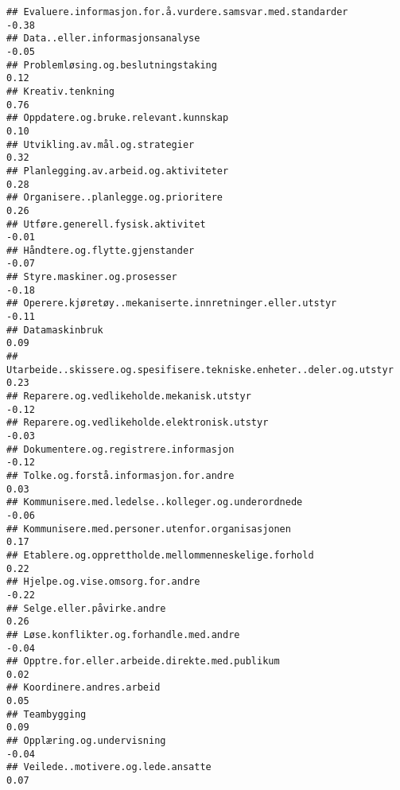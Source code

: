\documentclass[
]{article}
\begin{document}
\begin{verbatim}
## Evaluere.informasjon.for.å.vurdere.samsvar.med.standarder                        -0.38
## Data..eller.informasjonsanalyse                                                  -0.05
## Problemløsing.og.beslutningstaking                                                0.12
## Kreativ.tenkning                                                                  0.76
## Oppdatere.og.bruke.relevant.kunnskap                                              0.10
## Utvikling.av.mål.og.strategier                                                    0.32
## Planlegging.av.arbeid.og.aktiviteter                                              0.28
## Organisere..planlegge.og.prioritere                                               0.26
## Utføre.generell.fysisk.aktivitet                                                 -0.01
## Håndtere.og.flytte.gjenstander                                                   -0.07
## Styre.maskiner.og.prosesser                                                      -0.18
## Operere.kjøretøy..mekaniserte.innretninger.eller.utstyr                          -0.11
## Datamaskinbruk                                                                    0.09
## Utarbeide..skissere.og.spesifisere.tekniske.enheter..deler.og.utstyr              0.23
## Reparere.og.vedlikeholde.mekanisk.utstyr                                         -0.12
## Reparere.og.vedlikeholde.elektronisk.utstyr                                      -0.03
## Dokumentere.og.registrere.informasjon                                            -0.12
## Tolke.og.forstå.informasjon.for.andre                                             0.03
## Kommunisere.med.ledelse..kolleger.og.underordnede                                -0.06
## Kommunisere.med.personer.utenfor.organisasjonen                                   0.17
## Etablere.og.opprettholde.mellommenneskelige.forhold                               0.22
## Hjelpe.og.vise.omsorg.for.andre                                                  -0.22
## Selge.eller.påvirke.andre                                                         0.26
## Løse.konflikter.og.forhandle.med.andre                                           -0.04
## Opptre.for.eller.arbeide.direkte.med.publikum                                     0.02
## Koordinere.andres.arbeid                                                          0.05
## Teambygging                                                                       0.09
## Opplæring.og.undervisning                                                        -0.04
## Veilede..motivere.og.lede.ansatte                                                 0.07

\end{verbatim}
\end{document}
